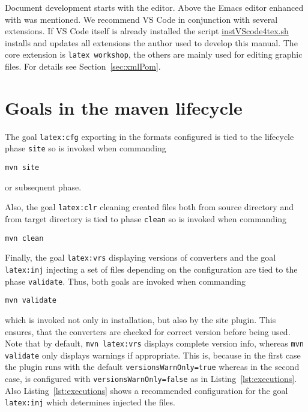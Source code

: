 Document development starts with the editor. 
Above the Emacs editor enhanced with \auctex{} was mentioned. 
We recommend VS Code in conjunction with several extensions. 
If VS Code itself is already installed 
the script \href{\urlSite fromMain/instVScode4tex}{instVScode4tex.sh} 
installs and updates all extensions 
the author used to develop this manual. 
The core extension is \texttt{latex workshop}, 
the others are mainly used for editing graphic files. 
For details see Section~\ref{sec:xmlPom}. 








\section{Goals in the maven lifecycle}\label{sec:usageLifecycle}

The goal \texttt{latex:cfg} exporting in the formats configured
is tied to the lifecycle phase \texttt{site} so is invoked
when commanding
%
\begin{Verbatim}[fontsize=\scriptsize]
mvn site
\end{Verbatim}
%
or subsequent phase.

Also, the goal \texttt{latex:clr} cleaning created files
both from source directory and from target directory
is tied to phase \texttt{clean} so is invoked
when commanding
%
\begin{Verbatim}[fontsize=\scriptsize]
mvn clean
\end{Verbatim}

Finally, the goal \texttt{latex:vrs} displaying versions of converters 
and the goal \texttt{latex:inj} injecting a set of files 
depending on the configuration 
are tied to the phase \texttt{validate}. 
Thus, both goals are invoked when commanding
%
\begin{Verbatim}[fontsize=\scriptsize]
mvn validate
\end{Verbatim}
%
which is invoked not only in installation, but also by the site plugin.
This ensures, that the converters are checked for correct version
before being used. 
Note that by default, \texttt{mvn latex:vrs} displays complete version info,
whereas \texttt{mvn validate} only displays warnings if appropriate. 
This is, because in the first case the plugin runs with the default \texttt{versionsWarnOnly=true} 
whereas in the second case, is configured with \texttt{versionsWarnOnly=false} 
as in Listing~\ref{lst:executions}. 
Also Listing~\ref{lst:executions} shows a recommended configuration 
for the goal \texttt{latex:inj} which determines injected the files. 




